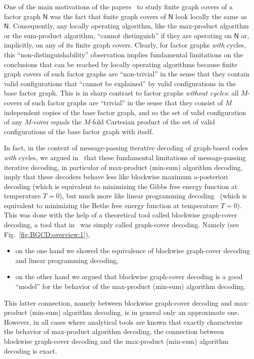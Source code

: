 \documentclass[journal, twocolumn]{IEEEtran}
\newcommand{\graph}[1]{\mathsf{#1}}
\newcommand{\graphN}{\graph{N}}
\newcommand{\?}{\mathrm{?}}
\begin{document}
One of the main motivations of the papers~\cite{Koetter:Vontobel:03:1,
  Vontobel:Koetter:05:1:subm} to study finite graph covers of a factor graph
$\graphN$ was the fact that finite graph covers of $\graphN$ look locally the
same as $\graphN$. Consequently, any locally operating algorithm, like the
max-product algorithm or the sum-product algorithm, ``cannot distinguish'' if
they are operating on $\graphN$ or, implicitly, on any of its finite graph
covers. Clearly, for factor graphs \emph{with} cycles, this
``non-distinguishability'' observation implies fundamental limitations on the
conclusions that can be reached by locally operating algorithms because finite
graph covers of such factor graphs are ``non-trivial'' in the sense that they
contain valid configurations that ``cannot be explained'' by valid
configurations in the base factor graph. This is in sharp contrast to factor
graphs \emph{without cycles}: all $M$-covers of such factor graphs are
``trivial'' in the sense that they consist of $M$ independent copies of the
base factor graph, and so the set of valid configuration of any $M$-cover
equals the $M$-fold Cartesian product of the set of valid configurations of
the base factor graph with itself.

In fact, in the context of message-passing iterative decoding of graph-based
codes \emph{with} cycles, we argued in~\cite{Vontobel:Koetter:05:1:subm,
  Vontobel:Koetter:04:2} that these fundamental limitations of message-passing
iterative decoding, in particular of max-product (min-sum) algorithm decoding,
imply that these decoders behave less like blockwise maximum a-posteriori
decoding (which is equivalent to minimizing the Gibbs free energy function at
temperature $T = 0$), but much more like linear programming
decoding~\cite{Feldman:03:1, Feldman:Wainwright:Karger:05:1} (which is
equivalent to minimizing the Bethe free energy function at temperature $T =
0$). This was done with the help of a theoretical tool called blockwise
graph-cover decoding, a tool that in~\cite{Vontobel:Koetter:05:1:subm} was
simply called graph-cover decoding. Namely (see
Fig.~\ref{fig:BGCD:overview:1}),
\begin{itemize}

\item on the one hand we showed the equivalence of blockwise graph-cover
  decoding and linear programming decoding,

\item on the other hand we argued that blockwise graph-cover decoding is a
  good ``model'' for the behavior of the max-product (min-sum) algorithm
  decoding.

\end{itemize}
This latter connection, namely between blockwise graph-cover decoding and
max-product (min-sum) algorithm decoding, is in general only an approximate
one. However, in all cases where analytical tools are known that exactly
characterize the behavior of max-product algorithm decoding, the connection
between blockwise graph-cover decoding and the max-product (min-sum) algorithm
decoding is exact.
\end{document}
